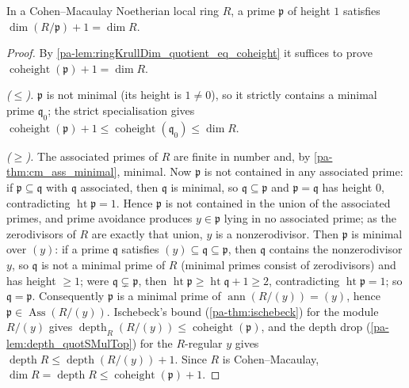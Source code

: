 \begin{theorem}
  \label{pa-thm:cm_height_one}
  \leanok

  In a Cohen--Macaulay Noetherian local ring \(R\), a prime \(\mathfrak p\) of
  height \(1\) satisfies \(\dim(R/\mathfrak p) + 1 = \dim R\).
\end{theorem}
\begin{proof}
  \leanok
  By \ref{pa-lem:ringKrullDim_quotient_eq_coheight} it suffices to prove
  \(\operatorname{coheight}(\mathfrak p) + 1 = \dim R\).

  \emph{(\(\le\)).} \(\mathfrak p\) is not minimal (its height is \(1 \neq 0\)),
  so it strictly contains a minimal prime \(\mathfrak q_0\); the strict
  specialisation gives \(\operatorname{coheight}(\mathfrak p) + 1 \le
  \operatorname{coheight}(\mathfrak q_0) \le \dim R\).

  \emph{(\(\ge\)).} The associated primes of \(R\) are finite in number and, by
  \ref{pa-thm:cm_ass_minimal}, minimal. Now \(\mathfrak p\) is not contained in any
  associated prime: if \(\mathfrak p \subseteq \mathfrak q\) with \(\mathfrak q\)
  associated, then \(\mathfrak q\) is minimal, so \(\mathfrak q \subseteq
  \mathfrak p\) and \(\mathfrak p = \mathfrak q\) has height \(0\), contradicting
  \(\operatorname{ht} \mathfrak p = 1\). Hence \(\mathfrak p\) is not contained in
  the union of the associated primes, and prime avoidance produces
  \(y \in \mathfrak p\) lying in no associated prime; as the zerodivisors of
  \(R\) are exactly that union, \(y\) is a nonzerodivisor. Then \(\mathfrak p\)
  is minimal over \((y)\): if a prime \(\mathfrak q\) satisfies
  \((y) \subseteq \mathfrak q \subseteq \mathfrak p\), then \(\mathfrak q\)
  contains the nonzerodivisor \(y\), so \(\mathfrak q\) is not a minimal prime of
  \(R\) (minimal primes consist of zerodivisors) and has height \(\ge 1\); were
  \(\mathfrak q \subsetneq \mathfrak p\), then \(\operatorname{ht} \mathfrak p \ge
  \operatorname{ht} \mathfrak q + 1 \ge 2\), contradicting \(\operatorname{ht}
  \mathfrak p = 1\); so \(\mathfrak q = \mathfrak p\). Consequently
  \(\mathfrak p\) is a minimal prime of \(\operatorname{ann}(R/(y)) = (y)\), hence
  \(\mathfrak p \in \operatorname{Ass}(R/(y))\). Ischebeck's bound
  (\ref{pa-thm:ischebeck}) for the module \(R/(y)\) gives
  \(\operatorname{depth}_R(R/(y)) \le \operatorname{coheight}(\mathfrak p)\), and
  the depth drop (\ref{pa-lem:depth_quotSMulTop}) for the \(R\)-regular \(y\) gives
  \(\operatorname{depth} R \le \operatorname{depth}(R/(y)) + 1\). Since \(R\) is
  Cohen--Macaulay, \(\dim R = \operatorname{depth} R \le
  \operatorname{coheight}(\mathfrak p) + 1\).
\end{proof}

